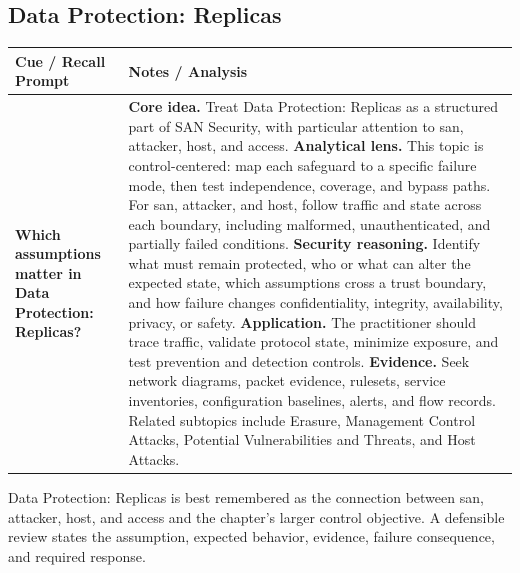 \documentclass[11pt]{article}
\newcommand{\CornellHeader}{%
\rowcolor{Navy}\color{white}\bfseries Cue / Recall Prompt & \color{white}\bfseries Notes / Analysis\\\hline}
\newcommand{\CornellRow}[2]{%
\cellcolor{CueGray}\RaggedRight\textbf{#1} & \RaggedRight #2\\\hline}
\begin{document}
\subsection*{Data Protection: Replicas}
\begin{longtable}{>{\RaggedRight\arraybackslash}p{}|>{\RaggedRight\arraybackslash}p{}}
\CornellHeader
\CornellRow{Which assumptions matter in Data Protection: Replicas?}{\textbf{Core idea.} Treat Data Protection: Replicas as a structured part of SAN Security, with particular attention to san, attacker, host, and access. \textbf{Analytical lens.} This topic is control-centered: map each safeguard to a specific failure mode, then test independence, coverage, and bypass paths. For san, attacker, and host, follow traffic and state across each boundary, including malformed, unauthenticated, and partially failed conditions. \textbf{Security reasoning.} Identify what must remain protected, who or what can alter the expected state, which assumptions cross a trust boundary, and how failure changes confidentiality, integrity, availability, privacy, or safety. \textbf{Application.} The practitioner should trace traffic, validate protocol state, minimize exposure, and test prevention and detection controls. \textbf{Evidence.} Seek network diagrams, packet evidence, rulesets, service inventories, configuration baselines, alerts, and flow records. Related subtopics include Erasure, Management Control Attacks, Potential Vulnerabilities and Threats, and Host Attacks.}
\end{longtable}
\begin{topicsummary}
Data Protection: Replicas is best remembered as the connection between san, attacker, host, and access and the chapter's larger control objective. A defensible review states the assumption, expected behavior, evidence, failure consequence, and required response.
\end{topicsummary}
\end{document}

